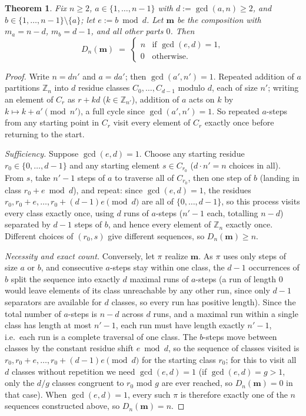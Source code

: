 \documentclass[11pt,a4paper]{amsart}
\newtheorem{theorem}{Theorem}[section]
\newcommand{\Z}{\mathbb{Z}}
\newcommand{\1}{\mathbf{1}}
\begin{document}
\begin{theorem}\label{thm:two-value}
Fix $n\ge2$, $a\in\{1,\dots,n-1\}$ with $d:=\gcd(a,n)\ge2$, and $b\in\{1,\dots,n-1\}\setminus\{a\}$; let $e:=b\bmod d$. Let $\mathbf m$ be the composition with $m_a=n-d$, $m_b=d-1$, and all other parts $0$. Then
\[
D_n(\mathbf m) \;=\; \begin{cases} n & \text{if } \gcd(e,d)=1,\\ 0 & \text{otherwise.}\end{cases}
\]
\end{theorem}
\begin{proof}
Write $n=dn'$ and $a=da'$; then $\gcd(a',n')=1$. Repeated addition of $a$ partitions $\Z_n$ into $d$ residue classes $C_0,\dots,C_{d-1}$ modulo $d$, each of size $n'$; writing an element of $C_r$ as $r+kd$ ($k\in\Z_{n'}$), addition of $a$ acts on $k$ by $k\mapsto k+a'\pmod{n'}$, a full cycle since $\gcd(a',n')=1$. So repeated $a$-steps from any starting point in $C_r$ visit every element of $C_r$ exactly once before returning to the start.

\emph{Sufficiency.} Suppose $\gcd(e,d)=1$. Choose any starting residue $r_0\in\{0,\dots,d-1\}$ and any starting element $s\in C_{r_0}$ ($d\cdot n'=n$ choices in all). From $s$, take $n'-1$ steps of $a$ to traverse all of $C_{r_0}$, then one step of $b$ (landing in class $r_0+e\bmod d$), and repeat: since $\gcd(e,d)=1$, the residues $r_0,r_0+e,\dots,r_0+(d-1)e\pmod d$ are all of $\{0,\dots,d-1\}$, so this process visits every class exactly once, using $d$ runs of $a$-steps ($n'-1$ each, totalling $n-d$) separated by $d-1$ steps of $b$, and hence every element of $\Z_n$ exactly once. Different choices of $(r_0,s)$ give different sequences, so $D_n(\mathbf m)\ge n$.

\emph{Necessity and exact count.} Conversely, let $\pi$ realize $\mathbf m$. As $\pi$ uses only steps of size $a$ or $b$, and consecutive $a$-steps stay within one class, the $d-1$ occurrences of $b$ split the sequence into exactly $d$ maximal runs of $a$-steps (a run of length $0$ would leave elements of its class unreachable by any other run, since only $d-1$ separators are available for $d$ classes, so every run has positive length). Since the total number of $a$-steps is $n-d$ across $d$ runs, and a maximal run within a single class has length at most $n'-1$, each run must have length exactly $n'-1$, i.e.\ each run is a complete traversal of one class. The $b$-steps move between classes by the constant residue shift $e\bmod d$, so the sequence of classes visited is $r_0,r_0+e,\dots,r_0+(d-1)e\pmod d$ for the starting class $r_0$; for this to visit all $d$ classes without repetition we need $\gcd(e,d)=1$ (if $\gcd(e,d)=g>1$, only the $d/g$ classes congruent to $r_0$ mod $g$ are ever reached, so $D_n(\mathbf m)=0$ in that case). When $\gcd(e,d)=1$, every such $\pi$ is therefore exactly one of the $n$ sequences constructed above, so $D_n(\mathbf m)=n$.
\end{proof}
\end{document}
